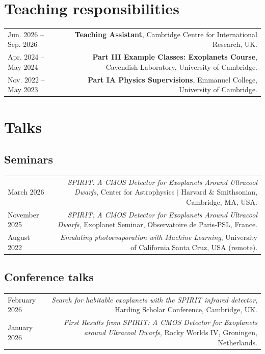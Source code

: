 \documentclass{article}
\begin{document}
\section*{Teaching responsibilities}
\begin{tabular}{L!{\vrule}R}
	Jun. 2026 -- Sep. 2026 & \textbf{Teaching Assistant}, Cambridge Centre for International Research, UK. \\
	Apr. 2024 -- May 2024 & \textbf{Part III Example Classes: Exoplanets Course}, Cavendish Laboratory, University of Cambridge. \\
  Nov. 2022 -- May 2023 & \textbf{Part IA Physics Supervisions}, Emmanuel College, University of Cambridge.\\
\end{tabular}

\section*{Talks}
\subsection*{Seminars} 
\begin{tabular}{L!{\vrule}R}
    March 2026 & \textit{SPIRIT: A CMOS Detector for Exoplanets Around Ultracool Dwarfs}, Center for Astrophysics $|$ Harvard \& Smithsonian, Cambridge, MA, USA. \\
    November 2025 & \textit{SPIRIT: A CMOS Detector for Exoplanets Around Ultracool Dwarfs}, Exoplanet Seminar, Observatoire de Paris-PSL, France. \\
    August 2022 & \textit{Emulating photoevaporation with Machine Learning}, University of California Santa Cruz, USA (remote). \\
\end{tabular}

\subsection*{Conference talks}
\begin{tabular}{L!{\vrule}R}
    February 2026 & \textit{Search for habitable exoplanets with the SPIRIT infrared detector}, Harding Scholar Conference, Cambridge, UK. \\
    January 2026 & \textit{First Results from SPIRIT: A CMOS Detector for Exoplanets around Ultracool Dwarfs}, Rocky Worlds IV, Groningen, Netherlands. \\
\end{tabular}
\end{document}
